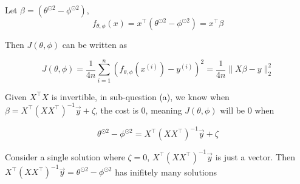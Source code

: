\begin{answer}

Let $\beta = (\theta^{\odot 2} -\phi^{\odot 2})$,
\begin{equation}
	f_{\theta,\phi}(x)=x^\top (\theta^{\odot 2} -\phi^{\odot 2}) = x^\top \beta
\end{equation}

Then $J(\theta,\phi)$ can be written as 

\begin{equation}
    J(\theta,\phi)=\frac{1}{4n}\sum_{i=1}^{n}(f_{\theta,\phi}(x^{(i)})-y^{(i)})^2 = \frac{1}{4n} \| X \beta - y \|_2^2
\end{equation}

Given $X^\top X$ is invertible, in sub-question (a), we know when $\beta=X^\top (XX^\top)^{-1}\vec{y}+\zeta$, the cost is 0, meaning $J(\theta, \phi)$ will be 0 when 

\begin{equation}
    \theta^{\odot 2} -\phi^{\odot 2} = X^\top (XX^\top)^{-1}\vec{y}+\zeta
\end{equation}

Consider a single solution where $\zeta = 0$, $X^\top (XX^\top)^{-1}\vec{y}$ is just a vector. Then $ X^\top (XX^\top)^{-1}\vec{y} = \theta^{\odot 2} -\phi^{\odot 2}$ has inifitely many solutions 
\end{answer}